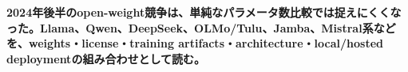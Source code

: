 \noindent\textbf{2024年後半のopen-weight競争は、単純なパラメータ数比較では捉えにくくなった。Llama、Qwen、DeepSeek、OLMo/Tulu、Jamba、Mistral系などを、weights・license・training artifacts・architecture・local/hosted deploymentの組み合わせとして読む。}\autocite{src-042479f9308f,src-8f8555b73e1b,src-e8f0a037900e}

